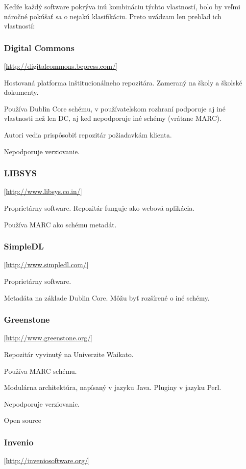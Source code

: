 \documentclass[thesis=M,slovak]{FITthesis}[2013/05/06]
\begin{document}
Keďže každý software pokrýva inú kombináciu týchto vlastností, bolo by veľmi náročné pokúšať sa o nejakú klasifikáciu. Preto uvádzam len prehľad ich vlastností:

\subsubsection {Digital Commons}  [\url{http://digitalcommons.bepress.com/}]

Hostovaná platforma inštitucionálneho repozitára. Zameraný na školy a školské dokumenty.

Používa Dublin Core schému, v používateľskom rozhraní podporuje aj iné vlastnosti než len DC, aj keď nepodporuje iné schémy (vrátane MARC).

Autori vedia prispôsobiť repozitár požiadavkám klienta.

Nepodporuje verziovanie.

\subsubsection {LIBSYS}  [\url{http://www.libsys.co.in/}]

Proprietárny software. Repozitár funguje ako webová aplikácia.

Používa MARC ako schému metadát.

\subsubsection {SimpleDL}  [\url{http://www.simpledl.com/}]

Proprietárny software.

Metadáta na základe Dublin Core. Môžu byť rozšírené o iné schémy.

\subsubsection {Greenstone}  [\url{http://www.greenstone.org/}]

Repozitár vyvinutý na Univerzite Waikato.

Používa MARC schému.

Modulárna architektúra, napísaný v jazyku Java. Pluginy v jazyku Perl.

Nepodporuje verziovanie.

Open source

\subsubsection {Invenio}  [\url{http://inveniosoftware.org/}]
\end{document}
